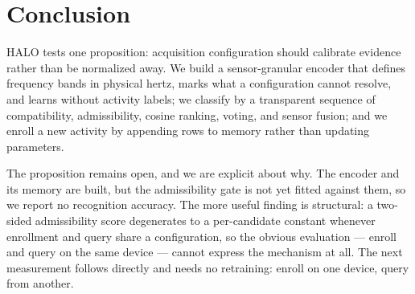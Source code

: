\section{Conclusion}
\label{sec:conclusion}

HALO tests one proposition: acquisition configuration should calibrate evidence rather than be
normalized away. We build a sensor-granular encoder that defines frequency bands in physical hertz,
marks what a configuration cannot resolve, and learns without activity labels; we classify by a
transparent sequence of compatibility, admissibility, cosine ranking, voting, and sensor fusion; and
we enroll a new activity by appending rows to memory rather than updating parameters.

The proposition remains open, and we are explicit about why. The encoder and its memory are built,
but the admissibility gate is not yet fitted against them, so we report no recognition accuracy. The
more useful finding is structural: a two-sided admissibility score degenerates to a per-candidate
constant whenever enrollment and query share a configuration, so the obvious evaluation --- enroll
and query on the same device --- cannot express the mechanism at all. The next measurement follows
directly and needs no retraining: enroll on one device, query from another.
